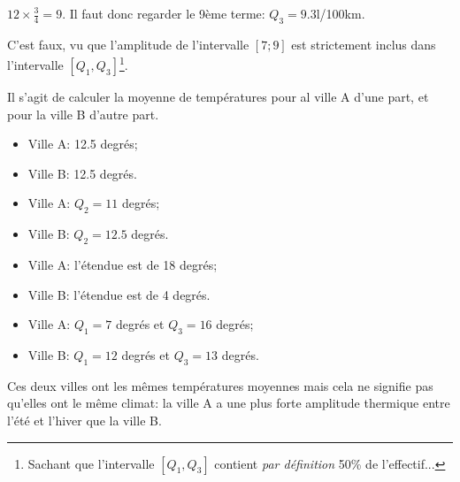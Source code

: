 \documentclass[a4paper,12pt]{scrartcl}
\begin{document}

$12 \times \frac{3}{4} = 9$. Il faut donc regarder le 9ème terme: $Q_3 = 9.3$l/100km.


C'est faux, vu que l'amplitude de l'intervalle $\left[ 7 ; 9 \right]$ est strictement inclus dans l'intervalle $\left[ Q_1, Q_3 \right]$\footnote{Sachant que l'intervalle $\left[ Q_1, Q_3 \right]$ contient \emph{par définition} 50\% de l'effectif...}.




Il s'agit de calculer la moyenne de températures pour al ville A d'une part, et pour la ville B d'autre part.

\begin{itemize}
 \item Ville A: 12.5 degrés;
 \item Ville B: 12.5 degrés.
\end{itemize}


\begin{itemize}
 \item Ville A: $Q_2 = 11$ degrés;
 \item Ville B: $Q_2 = 12.5$ degrés.
\end{itemize}


\begin{itemize}
 \item Ville A: l'étendue est de 18 degrés;
 \item Ville B: l'étendue est de 4 degrés.
\end{itemize}


\begin{itemize}
 \item Ville A: $Q_1 = 7$  degrés et $Q_3 = 16$ degrés;
 \item Ville B: $Q_1 = 12$ degrés et $Q_3 = 13$ degrés.
\end{itemize}


Ces deux villes ont les mêmes températures moyennes mais cela ne signifie pas qu'elles ont le même climat: la ville A a une plus forte amplitude thermique entre l'été et l'hiver que la ville B.


\end{document}
